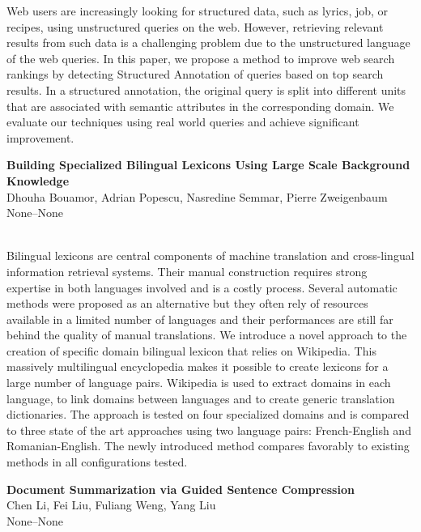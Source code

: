 \documentclass[twoside,makeidx]{book}
\renewcommand{\normalsize}{\fontsize{8}{9}\selectfont}
\renewcommand{\small}{\fontsize{7}{8}\selectfont}
\begin{document}
\nopagebreak%
\noindent%
{\small Web users are increasingly looking for structured data, such as lyrics, job, or recipes, using unstructured queries on the web. However, retrieving relevant results from such data is a challenging problem due to the unstructured language of the web queries. In this paper, we propose a method to improve web search rankings by detecting Structured Annotation of queries based on top search results. In a structured annotation, the original query is split into different units that are associated with semantic attributes in the corresponding domain. We evaluate our techniques using real world queries and achieve significant improvement.}
\par\vspace{2em}\noindent%
\begin{minipage}{\linewidth}%
\begin{center}
\textbf{\normalsize Building Specialized Bilingual Lexicons Using Large Scale Background Knowledge}\\
\normalsize  Dhouha Bouamor,  Adrian Popescu,  Nasredine Semmar,  Pierre Zweigenbaum\\
{\small None--None}\\
\end{center}
\end{minipage}\\[0.5em]
\nopagebreak%
\noindent%
{\small Bilingual lexicons are central components of machine translation and cross-lingual information retrieval systems.  Their manual construction requires strong expertise in both languages involved and is a costly process.  Several automatic methods were proposed as an alternative but they often rely of resources available in a limited number of languages and their performances are still far behind the quality of manual translations. We introduce a novel approach to the creation of specific domain bilingual lexicon that relies on Wikipedia. This massively multilingual encyclopedia makes it possible to create lexicons for a large number of language pairs.  Wikipedia is used to extract domains in each language, to link domains between languages and to create generic translation dictionaries.  The approach is tested on four specialized domains and is compared to three state of the art approaches using two language pairs: French-English and Romanian-English.  The newly introduced method compares favorably to existing methods in all configurations tested.}
\par\vspace{2em}\noindent%
\begin{minipage}{\linewidth}%
\begin{center}
\textbf{\normalsize Document Summarization via Guided Sentence Compression}\\
\normalsize  Chen Li,  Fei Liu,  Fuliang Weng,  Yang Liu\\
{\small None--None}\\
\end{center}
\end{minipage}\\[0.5em]
\end{document}
